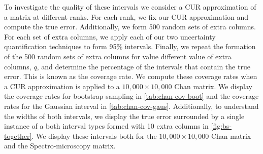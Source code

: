 \documentclass[11pt]{article}
\begin{document}
To investigate the quality of these intervals we consider a CUR approximation of a matrix at different ranks. For each rank, we fix our CUR approximation and compute the true error. Additionally, we form 500 random sets of extra columns. For each set of extra columns, we apply each of our two uncertainty quantification techniques to form 95\% intervals. Finally, we repeat the formation of the 500 random sets of extra columns for value different value of extra columns, $q$,  and determine the percentage of the intervals that contain the true error. This is known as the coverage rate. We compute these coverage rates when a CUR approximation is applied to a $10,000 \times 10,000$ Chan matrix. We display the coverage rates for bootstrap sampling in \cref{tab:chan-cov-boot} and the coverage rates for the Gaussian interval in \cref{tab:chan-cov-gaus}. Additionally, to understand the widths of both intervals, we display the true error surrounded by a single instance of a both interval types formed with 10 extra columns in \cref{fig:bs-together}. We display these intervals both for the $10,000 \times 10,000$ Chan matrix and the Spectro-microscopy matrix.
\end{document}

